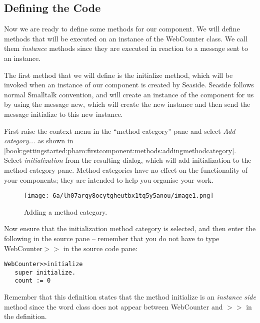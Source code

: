 \documentclass[a4paper,10pt,twoside]{book}
\newcommand{\ct}[1]{{\small\ttfamily\textup{#1}}}
\begin{document}
\subsection{Defining the Code}
\label{book:gettingstarted:pharo:firstcomponent:methods}

Now we are ready to define some methods for our component. We will define methods that will be executed on an instance of the \ct{WebCounter} class. We call them \textit{instance} methods since they are executed in reaction to a message sent to an instance.

The first method that we will define is the \ct{initialize} method, which will be invoked when an instance of our component is created by Seaside. Seaside follows normal Smalltalk convention, and will create an instance of the component for us by using the message \ct{new}, which will create the new instance and then send the message \ct{initialize} to this new instance.

First raise the context menu in the ``method category'' pane and select \textit{Add category...} as shown in \autoref{book:gettingstarted:pharo:firstcomponent:methods:addingmethodcategory}. Select \textit{initialization} from the resulting dialog, which will add \ct{initialization} to the method category pane. Method categories have no effect on the functionality of your components; they are intended to help you organise your work.

\begin{figure}[h!tbp]
	\begin{center}
		\texttt{[image: 6a/lh07arqy8ocytgheutbx1tq5y5anou/image1.png]}
		\caption{Adding a method category.\label{book:gettingstarted:pharo:firstcomponent:methods:addingmethodcategory}}
	\end{center}
\end{figure}


Now ensure that the \ct{initialization} method category is selected, and then enter the following in the source pane -- remember that you do not have to type WebCounter$>$$>$ in the source code pane:

\begin{lstlisting}
WebCounter>>initialize
   super initialize.
   count := 0
\end{lstlisting}

Remember that this definition states that the method \ct{initialize} is an \textit{instance side} method since the word \ct{class} does not appear between WebCounter and \ct{$>$$>$} in the definition.
\end{document}
